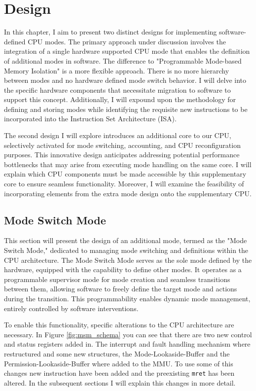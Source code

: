 \chapter{Design}
In this chapter, I aim to present two distinct designs for implementing
software-defined CPU modes. The primary approach under discussion involves the
integration of a single hardware supported CPU mode  that enables the definition
of additional modes in software. The difference to "Programmable Mode-based
Memory Isolation" is a more flexible approach. There is no more hierarchy between
modes and no hardware defined mode switch behavior. I will delve into the
specific hardware components that necessitate migration to software to support
this concept. Additionally, I will expound upon the methodology for defining and
storing modes while identifying the requisite new instructions to be
incorporated into the Instruction Set Architecture (ISA).\par
The second design I will explore introduces an additional core to our CPU,
selectively activated for mode switching, accounting, and CPU reconfiguration
purposes. This innovative design anticipates addressing potential performance
bottlenecks that may arise from executing mode handling on the same core. I will
explain which CPU components must be made accessible by this supplementary
core to ensure seamless functionality. Moreover, I will examine the feasibility
of incorporating elements from the extra mode design onto the supplementary CPU.  

\section{Mode Switch Mode}
This section will present the design of an additional mode, termed as the "Mode
Switch Mode," dedicated to managing mode switching and definitions within the
CPU architecture. The Mode Switch Mode serves as the sole mode defined by the
hardware, equipped with the capability to define other modes. It operates as a
programmable supervisor mode for mode creation and seamless transitions between
them, allowing software to freely define the target mode and actions during the
transition. This programmability enables dynamic mode management, entirely
controlled by software interventions.\par
To enable this functionality, specific alterations to the CPU architecture are
necessary. In Figure \ref{fig:msm_schema} you can see that there are two new
control and status registers added in. The interrupt and fault handling
mechanism where restructured and some new structures, the Mode-Lookaside-Buffer
and the Permission-Lookaside-Buffer where added to the MMU. To use some of this
changes new instruction have been added and the preexisting \texttt{mret} has
been altered. In the subsequent sections I will explain this changes in more detail.

